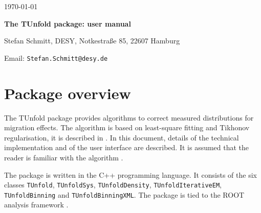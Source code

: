\documentclass[12pt]{article}
\newcommand{\tunfoldmajor}{17}
\newcommand{\tunfoldminor}{9}
\newcommand{\tunfoldversion}{{\tunfoldmajor{}.\tunfoldminor}}
\begin{document}
\begin{titlepage}
\noindent
\begin{flushleft}
\end{flushleft}
\noindent
       \today      \\

\vspace{2cm}
\begin{center}
\begin{Large}
{\bf The TUnfold package: user manual}
\vspace{2cm}

Stefan Schmitt, DESY, Notkestra\ss{}e 85, 22607 Hamburg

\vspace{0.5cm}
 Email: {\tt Stefan.Schmitt@desy.de}
\end{Large}
\end{center}

\vspace{2cm}

\begin{abstract}

{\em\noindent
TUnfold is a package with provides functionality for correcting
migration and background effects for multi-dimensional distributions.
This document gives a user-oriented technical description of the
package, valid for the version number \tunfoldversion.
}
\end{abstract}

\vspace{1.5cm}

\end{titlepage}

\section{Package overview}

The TUnfold package provides algorithms to correct
measured distributions for migration effects. The algorithm is based
on least-square fitting and Tikhonov regularisation, it is described
in \cite{Schmitt:2012kp}. In this document, details of the technical
implementation and of the user interface are described. It is assumed
that the reader is familiar with the algorithm \cite{Schmitt:2012kp}.

The package is written in the C++ programming language. It consists of
the six classes {\tt TUnfold}, {\tt TUnfoldSys}, {\tt TUnfoldDensity},
{\tt TUnfoldIterativeEM}, 
{\tt TUnfoldBinning} and {\tt TUnfoldBinningXML}. 
The package is tied to the ROOT analysis
framework \cite{Brun:1997pa}. 
\end{document}

